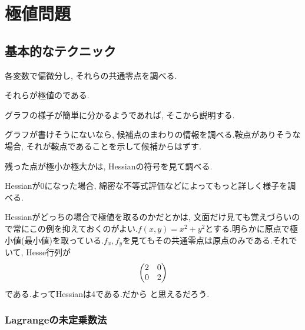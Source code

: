\section{極値問題}
\subsection{基本的なテクニック}
\ben
\item 各変数で偏微分し, それらの共通零点を調べる.
\item それらが極値のである.
\item グラフの様子が簡単に分かるようであれば, そこから説明する.
\item グラフが書けそうにないなら, 候補点のまわりの情報を調べる.鞍点がありそうな場合, それが鞍点であることを示して候補からはずす.
\item 残った点が極小か極大かは, Hessianの符号を見て調べる.
\item Hessianが0になった場合, 綿密な不等式評価などによってもっと詳しく様子を調べる.
\een
\begin{eg}
Hessianがどっちの場合で極値を取るのかだとかは, 文面だけ見ても覚えづらいので常にこの例を抑えておくのがよい.$f(x,y) = x^2 + y^2$とする.明らかに原点で極小値(最小値)を取っている.$f_x,f_y$を見てもその共通零点は原点のみである.それでいて, Hesse行列が
\[
\begin{pmatrix}
2 & 0 \\
0 & 2
\end{pmatrix}
\]
である.よってHessianは4である.だから と思えるだろう.
\end{eg}

\subsubsection{Lagrangeの未定乗数法}


